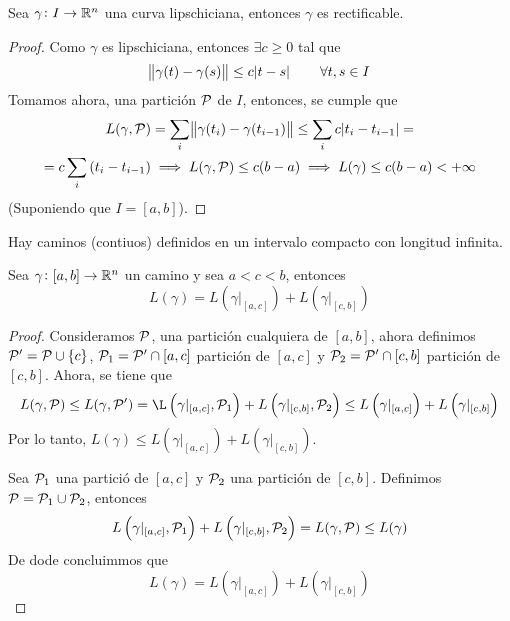 \begin{prop}
    Sea $\gamma \colon I \to \mathbb{R}^n$ una curva lipschiciana, entonces $\gamma$ es rectificable.
\end{prop}

\begin{proof}
    Como $\gamma$ es lipschiciana, entonces $\exists c \geq 0$ tal que
    \[
        \norm{\gamma(t) - \gamma(s)} \leq c \abs{t - s} \qquad \forall t,s \in I
    \]
    Tomamos ahora, una partición $\mathcal{P}$ de $I$, entonces, se cumple que
    \begin{gather*}
        L(\gamma, \mathcal{P}) = \sum_i \norm{\gamma(t_i) - \gamma(t_{i-1})} \leq \sum_i c \abs{t_i - t_{i-1}} = \\
        = c \sum_i \left( t_i - t_{i-1} \right) \implies L(\gamma, \mathcal{P}) \leq c (b - a) \implies
        L(\gamma) \leq c(b-a) < +\infty
    \end{gather*}
    (Suponiendo que $I = [a, b]$).
\end{proof}

\begin{obs*}
    Hay caminos (contiuos) definidos en un intervalo compacto con longitud infinita.
\end{obs*}

\begin{prop}
    Sea $\gamma \colon [a, b] \to \mathbb{R}^n$ un camino y sea $a < c < b$, entonces
    \[
        L(\gamma) = L\left( \gamma\vert_{[a,c]} \right) + L\left( \gamma\vert_{[c,b]} \right)
    \]
\end{prop}

\begin{proof}
    Consideramos $\mathcal{P}$, una partición cualquiera de $[a,b]$, ahora definimos $\mathcal{P}^\prime = \mathcal{P} \cup \{c\}$,
    $\mathcal{P}_1 = \mathcal{P}^\prime \cap [a,c]$ partición de $[a,c]$ y $\mathcal{P}_2 = \mathcal{P}^\prime \cap [c, b]$ partición de $[c, b]$.
    Ahora, se tiene que
    \[
        L(\gamma, \Pa) \leq L(\gamma, \Pa^\prime) = \L\left( \gamma\vert_{[a,c]}, \Pa_1 \right) +
        L\left( \gamma\vert_{[c,b]}, \Pa_2 \right) \leq L\left( \gamma\vert_{[a,c]} \right) +
        L\left( \gamma\vert_{[c,b]} \right)
    \]
    Por lo tanto, $L(\gamma) \leq L\left( \gamma\vert_{[a,c]} \right) + L \left( \gamma\vert_{[c,b]} \right)$.

    Sea $\mathcal{P}_1$ una partició de $[a, c]$ y $\mathcal{P}_2$ una partición de $[c, b]$. Definimos $\mathcal{P} = \mathcal{P}_1 \cup \mathcal{P}_2$,
    entonces
    \[
        L\left( \gamma\vert_{[a,c]}, \mathcal{P}_1 \right) + L\left( \gamma\vert_{[c,b]}, \mathcal{P}_2 \right) = L(\gamma, \mathcal{P}) \leq L(\gamma)
    \]
    De dode concluimmos que
    \[
        L(\gamma) = L\left( \gamma\vert_{[a,c]} \right) + L\left( \gamma\vert_{[c,b]} \right)
    \]
\end{proof}

